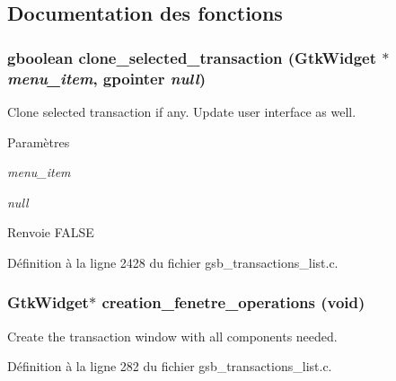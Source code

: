 \subsection{Documentation des fonctions}
\subsubsection[{clone\_\-selected\_\-transaction}]{\setlength{\rightskip}{0pt plus 5cm}gboolean clone\_\-selected\_\-transaction (GtkWidget $\ast$ {\em menu\_\-item}, \/  gpointer {\em null})}\label{gsb__transactions__list_8c_a8da0807401b34e59349e9534ed0e9cd9}
Clone selected transaction if any. Update user interface as well.


\begin{DoxyParams}{Paramètres}
\item[{\em menu\_\-item}]\item[{\em null}]\end{DoxyParams}
\begin{DoxyReturn}{Renvoie}
FALSE 
\end{DoxyReturn}


Définition à la ligne 2428 du fichier gsb\_\-transactions\_\-list.c.

\subsubsection[{creation\_\-fenetre\_\-operations}]{\setlength{\rightskip}{0pt plus 5cm}GtkWidget$\ast$ creation\_\-fenetre\_\-operations (void)}\label{gsb__transactions__list_8c_a750143785ed9e62525a92754c8262f55}
Create the transaction window with all components needed. 

Définition à la ligne 282 du fichier gsb\_\-transactions\_\-list.c.

